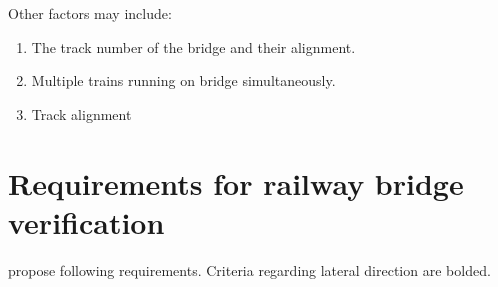 \vspace*{0.2cm}

Other factors may include:

\begin{enumerate}

	\item The track number of the bridge and their alignment. 
	\item Multiple trains running on bridge simultaneously. 
	\item Track alignment

\end{enumerate}

\section{Requirements for railway bridge verification}
\citet{EC0} propose following requirements. Criteria regarding lateral direction are bolded.


